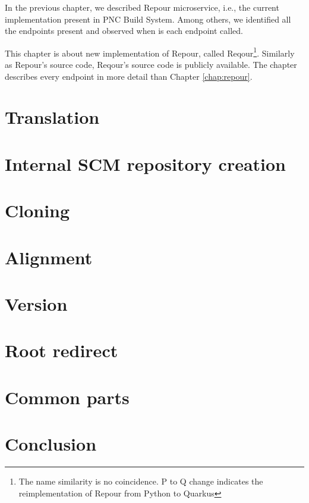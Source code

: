 \documentclass[../../main.tex]{subfiles}
\begin{document}
In the previous chapter, we described Repour microservice, i.e., the current implementation present in PNC Build System. Among others, we identified all the endpoints present and observed when is each endpoint called.

This chapter is about new implementation of Repour, called Reqour\footnote{The name similarity is no coincidence. P to Q change indicates the reimplementation of Repour from Python to Quarkus}. Similarly as Repour's source code, Reqour's source code is publicly available\cite{reqour}. The chapter describes every endpoint in more detail than Chapter \ref{chap:repour}.

\section{Translation}


\section{Internal SCM repository creation}


\section{Cloning}


\section{Alignment}


\section{Version}


\section{Root redirect}


\section{Common parts}


\section{Conclusion}

\end{document}
